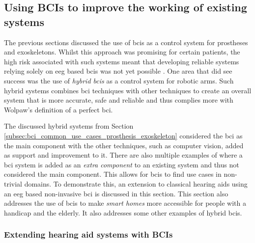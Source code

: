 
\subsection{Using BCIs to improve the working of existing systems}
\label{subsec:bci_common_use_cases_improving_existing_system}

The previous sections discussed the use of \glspl{bci} as a control system for prostheses and exoskeletons.
Whilst this approach was promising for certain patients, the high risk associated with such systems meant that developing reliable systems relying solely on \gls{eeg} based \glspl{bci} was not yet possible \citep{bci_prostheses}.
One area that did see success was the use of \textit{hybrid \glspl{bci}} as a control system for robotic arms.
Such hybrid systems combines \gls{bci} techniques with other techniques to create an overall system that is more accurate, safe and reliable and thus complies more with Wolpaw's definition of a perfect \gls{bci}.

The discussed hybrid systems from Section \ref{subsec:bci_common_use_cases_prosthesis_exoskeleton} considered the \gls{bci} as the main component with the other techniques, such as computer vision, added as support and improvement to it.
There are also multiple examples of where a \gls{bci} system is added as an \textit{extra component} to an existing system and thus not considered the main component.
This allows for \glspl{bci} to find use cases in non-trivial domains.
To demonstrate this, an extension to classical hearing aids using an \gls{eeg} based non-invasive \gls{bci} is discussed in this section.
This section also addresses the use of \glspl{bci} to make \textit{smart homes} more accessible for people with a handicap and the elderly.
It also addresses some other examples of hybrid \glspl{bci}.



\subsubsection{Extending hearing aid systems with BCIs}
\label{subsubsec:bci_common_use_cases_improving_existing_system_hearing_aids}

